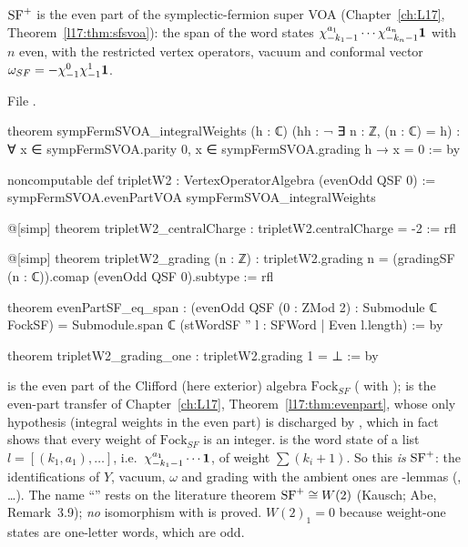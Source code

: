 \begin{definition}\label{l18:def:tripletW2}
$\mathrm{SF}^+$ is the even part of the symplectic-fermion super VOA 
(Chapter~\ref{ch:L17}, Theorem~\ref{l17:thm:sfsvoa}): the span of the word states
$\chi^{a_1}_{-k_1-1}\cdots\chi^{a_n}_{-k_n-1}\mathbf{1}$ with $n$ even, with the restricted vertex
operators, vacuum and conformal vector $\omega_{SF}=-\chi^0_{-1}\chi^1_{-1}\mathbf{1}$.
\end{definition}
\noindent File .
\begin{leancode}
theorem sympFermSVOA_integralWeights (h : ℂ) (hh : ¬ ∃ n : ℤ, (n : ℂ) = h) :
    ∀ x ∈ sympFermSVOA.parity 0, x ∈ sympFermSVOA.grading h → x = 0 := by

noncomputable def tripletW2 : VertexOperatorAlgebra (evenOdd QSF 0) :=
  sympFermSVOA.evenPartVOA sympFermSVOA_integralWeights

@[simp] theorem tripletW2_centralCharge : tripletW2.centralCharge = -2 := rfl

@[simp] theorem tripletW2_grading (n : ℤ) :
    tripletW2.grading n = (gradingSF (n : ℂ)).comap (evenOdd QSF 0).subtype := rfl

theorem evenPartSF_eq_span :
    (evenOdd QSF (0 : ZMod 2) : Submodule ℂ FockSF)
      = Submodule.span ℂ (stWordSF '' {l : SFWord | Even l.length}) := by

theorem tripletW2_grading_one : tripletW2.grading 1 = ⊥ := by
\end{leancode}
\begin{dictionary}
 is the even part of the Clifford (here exterior) algebra $\mathrm{Fock}_{SF}$
( with );  is the even-part
transfer of Chapter~\ref{ch:L17}, Theorem~\ref{l17:thm:evenpart}, whose only hypothesis (integral weights
in the even part) is discharged by , which in fact shows that every
weight of $\mathrm{Fock}_{SF}$ is an integer.  is the word state of a list
$l=[(k_1,a_1),\dots]$, i.e.\ $\chi^{a_1}_{-k_1-1}\cdots\mathbf{1}$, of weight $\sum(k_i+1)$. So this \emph{is}
$\mathrm{SF}^+$: the identifications of $Y$, vacuum, $\omega$ and grading with the ambient ones are
-lemmas (, \dots). The name ``'' rests on the literature
theorem $\mathrm{SF}^+\cong W(2)$ (Kausch; Abe, Remark~3.9); \emph{no} isomorphism with
 is proved. $W(2)_1=0$ because weight-one states are one-letter words, which are odd.
\end{dictionary}
